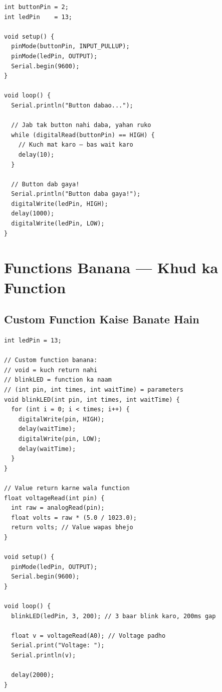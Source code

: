 \documentclass[12pt,a4paper]{article}
\begin{document}
\begin{tcolorbox}[codebox=Example 13: while Loop — Button Dabne tak Wait Karo]
\begin{lstlisting}
int buttonPin = 2;
int ledPin    = 13;

void setup() {
  pinMode(buttonPin, INPUT_PULLUP);
  pinMode(ledPin, OUTPUT);
  Serial.begin(9600);
}

void loop() {
  Serial.println("Button dabao...");

  // Jab tak button nahi daba, yahan ruko
  while (digitalRead(buttonPin) == HIGH) {
    // Kuch mat karo — bas wait karo
    delay(10);
  }

  // Button dab gaya!
  Serial.println("Button daba gaya!");
  digitalWrite(ledPin, HIGH);
  delay(1000);
  digitalWrite(ledPin, LOW);
}
\end{lstlisting}
\end{tcolorbox}

\newpage

\section{Functions Banana — Khud ka Function}

\subsection{Custom Function Kaise Banate Hain}

\begin{tcolorbox}[codebox=Example 14: Custom Function — LED Blink Function]
\begin{lstlisting}
int ledPin = 13;

// Custom function banana:
// void = kuch return nahi
// blinkLED = function ka naam
// (int pin, int times, int waitTime) = parameters
void blinkLED(int pin, int times, int waitTime) {
  for (int i = 0; i < times; i++) {
    digitalWrite(pin, HIGH);
    delay(waitTime);
    digitalWrite(pin, LOW);
    delay(waitTime);
  }
}

// Value return karne wala function
float voltageRead(int pin) {
  int raw = analogRead(pin);
  float volts = raw * (5.0 / 1023.0);
  return volts; // Value wapas bhejo
}

void setup() {
  pinMode(ledPin, OUTPUT);
  Serial.begin(9600);
}

void loop() {
  blinkLED(ledPin, 3, 200); // 3 baar blink karo, 200ms gap

  float v = voltageRead(A0); // Voltage padhо
  Serial.print("Voltage: ");
  Serial.println(v);

  delay(2000);
}
\end{lstlisting}
\end{tcolorbox}
\end{document}
